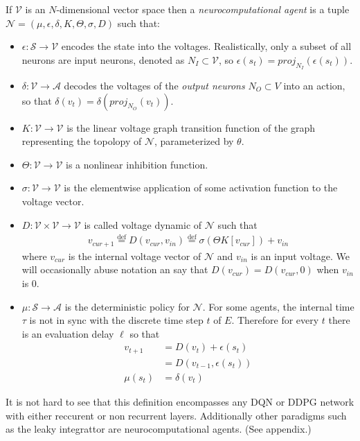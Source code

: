 \documentclass{article} %
\numberwithin{equation}{subsection}
\numberwithin{theorem}{subsection}
\def\defeq{\stackrel{\text{def}}{=}}
\def\scriptv{{\mathcal V}}
\def\scripta{{\mathcal A}}
\def\scriptn{{\mathcal N}}
\def\scripts{{\mathcal S}}
\begin{document}
If $\scriptv$ is an $N$-dimensional vector space then a \emph{neurocomputational agent} is a tuple $\scriptn = (\mu, \epsilon, \delta, K, \Theta, \sigma, D)$ such that:
\begin{itemize}
    \item $\epsilon : \scripts  \to \scriptv$ encodes the state into the voltages. Realistically, only a subset of all neurons are input neurons, denoted as $N_I \subset \scriptv$, so $\epsilon(s_t) = proj_{N_I}(\epsilon(s_t))$.
    \item $\delta: \scriptv \to \scripta$ decodes the voltages of the \emph{output neurons } $N_O \subset V$ into an action, so that $\delta(v_t) = \delta(proj_{N_O}(v_t))$.
    \item $K: \scriptv \to \scriptv$ is the linear voltage graph transition function of the graph representing the topolopy of $\scriptn$, parameterized by $\theta$.
    \item $\Theta: \scriptv \to \scriptv$ is a nonlinear inhibition function.
    \item $\sigma: \scriptv \to \scriptv$ is the elementwise application of some activation function to the voltage vector.
    \item $D: \scriptv \times \scriptv \to \scriptv$ is called voltage dynamic of $\scriptn$ such that
    \begin{equation}
        \begin{aligned}
          v_{cur + 1} \defeq D(v_{cur},v_{in}) \defeq \sigma\left(\Theta K[v_{cur}]\right) + v_{in}
        \end{aligned}
    \end{equation}
    where $v_{cur}$ is the internal voltage vector of $\scriptn$ and $v_{in}$ is an input voltage. We will occasionally abuse notation an say that $D(v_{cur}) = D(v_{cur}, 0)$ when $v_{in}$ is 0.
    \item $\mu: \scripts \to \scripta$ is the deterministic policy for $\scriptn$. For some agents, the internal time $\tau$ is not in sync with the discrete time step $t$ of $E$.  Therefore for every $t$ there is an evaluation delay  $\ell$ so that
    \begin{equation}
    	\begin{aligned}
    		v_{t+1} &=  D(v_t) + \epsilon(s_t) \\
                &=  D(v_{t-1}, \epsilon(s_t)) \\
        \mu(s_t) &= \delta(v_t)
    	\end{aligned}
    \end{equation}
\end{itemize}
It is not hard to see that this definition encompasses any DQN or DDPG network with either reccurent or non recurrent layers. Additionally other paradigms such as the leaky integrattor are neurocomputational agents. (See appendix.)
\end{document}
